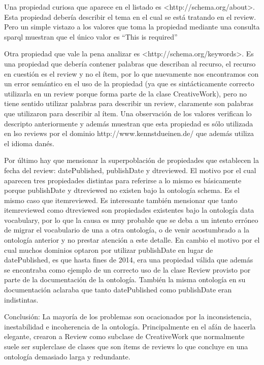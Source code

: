  Una propiedad curiosa que aparece en el listado es <http://schema.org/about>. Esta propiedad debería describir el tema en el cual 
 se está tratando en el review. Pero un simple vistazo a los valores que toma la propiedad mediante una consulta sparql muestran que 
 el único valor es ``This is required''
 
 Otra propiedad que vale la pena analizar es <http://schema.org/keywords>. Es una propiedad que debería contener palabras que describan al recurso, 
 el recurso en cuestión es el review y no el ítem, por lo que nuevamente nos encontramos con un error semántico en el uso de la propiedad (ya que es sintácticamente 
 correcto utilizarla en un review porque forma parte de la clase CreativeWork), pero no tiene sentido utilizar palabras para describir un review, claramente 
 son palabras que utilizaron para describir al ítem.
 Una observación de los valores verifican lo descripto anteriormente y además muestran que esta propiedad es sólo utilizada en lso reviews por el dominio 
 http://www.kennstdueinen.de/ que además utiliza el idioma danés.
 
 Por último hay que mensionar la superpoblación de propiedades que establecen la fecha del review: datePublished, publishDate y dtreviewed.
 El motivo por el cual aparecen tres propiedades distintas para referirse a lo mismo es básicamente porque publishDate y dtreviewed no existen bajo la 
 ontología schema. Es el mismo caso que itemreviewed. 
 Es interesante también mensionar que tanto itemreviewed como dtreviewed son propiedades existentes bajo la ontología data vocabulary, 
 por lo que la causa es muy probable que se deba a un intento erróneo de migrar el vocabulario de una a otra ontología, o de venir acostumbrado a la 
 ontología anterior y no prestar atención a este detalle.
 En cambio el motivo por el cual muchos dominios optaron por utilizar publishDate en lugar de datePublished, es que hasta fines de 2014, 
 era una propiedad válida que además se encontraba como ejemplo de un correcto uso de la clase Review provisto por parte de la documentación 
 de la ontología. 
 También la misma ontología en su documentación aclaraba que tanto datePublished como publishDate eran indistintas.
 
 Conclusión: La mayoría de los problemas son ocacionados por la inconsistencia, inestabilidad e incoherencia de la ontología. Principalmente 
 en el afán de hacerla elegante, crearon a Review como subclase de CreativeWork que normalmente suele ser suplerclase de clases que son ítems de reviews
 lo que concluye en una ontología demasiado larga y redundante.
 
